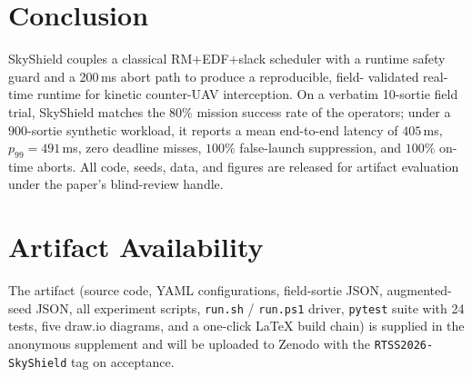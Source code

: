 \documentclass[conference]{IEEEtran}
\begin{document}
\section{Conclusion}
SkyShield couples a classical RM$+$EDF$+$slack scheduler with a runtime
safety guard and a 200\,ms abort path to produce a reproducible, field-
validated real-time runtime for kinetic counter-UAV interception.  On a
verbatim 10-sortie field trial, SkyShield matches the $80\%$ mission
success rate of the operators; under a $900$-sortie synthetic workload,
it reports a mean end-to-end latency of $405$\,ms, $p_{99}=491$\,ms,
zero deadline misses, $100\%$ false-launch suppression, and $100\%$
on-time aborts.  All code, seeds, data, and figures are released for
artifact evaluation under the paper's blind-review handle.

\section*{Artifact Availability}
The artifact (source code, YAML configurations, field-sortie JSON,
augmented-seed JSON, all experiment scripts, \texttt{run.sh} /
\texttt{run.ps1} driver, \texttt{pytest} suite with 24 tests, five
draw.io diagrams, and a one-click LaTeX build chain) is supplied in the
anonymous supplement and will be uploaded to Zenodo with the
\texttt{RTSS2026-SkyShield} tag on acceptance.



\end{document}
